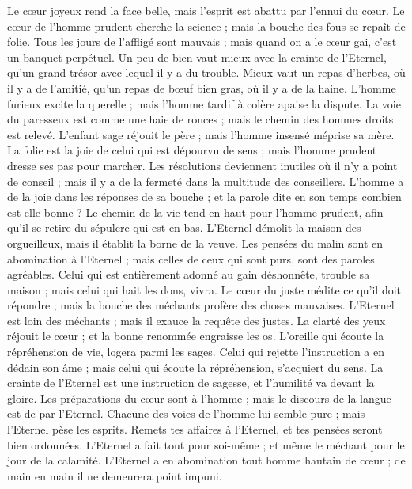 \begin{multicols}{2}
Le cœur joyeux rend la face belle, mais l'esprit est abattu par l'ennui du cœur.
Le cœur de l'homme prudent cherche la science ; mais la bouche des fous se repaît de folie.
Tous les jours de l'affligé sont mauvais ; mais quand on a le cœur gai, c'est un banquet perpétuel.
Un peu de bien vaut mieux avec la crainte de l'Eternel, qu'un grand trésor avec lequel il y a du trouble.
Mieux vaut un repas d'herbes, où il y a de l'amitié, qu'un repas de bœuf bien gras, où il y a de la haine.
L'homme furieux excite la querelle ; mais l'homme tardif à colère apaise la dispute.
La voie du paresseux est comme une haie de ronces ; mais le chemin des hommes droits est relevé.
L'enfant sage réjouit le père ; mais l'homme insensé méprise sa mère.
La folie est la joie de celui qui est dépourvu de sens ; mais l'homme prudent dresse ses pas pour marcher.
Les résolutions deviennent inutiles où il n'y a point de conseil ; mais il y a de la fermeté dans la multitude des conseillers.
L'homme a de la joie dans les réponses de sa bouche ; et la parole dite en son temps combien est-elle bonne ?
Le chemin de la vie tend en haut pour l'homme prudent, afin qu'il se retire du sépulcre qui est en bas.
L'Eternel démolit la maison des orgueilleux, mais il établit la borne de la veuve.
Les pensées du malin sont en abomination à l'Eternel ; mais celles de ceux qui sont purs, sont des paroles agréables.
Celui qui est entièrement adonné au gain déshonnête, trouble sa maison ; mais celui qui hait les dons, vivra.
Le cœur du juste médite ce qu'il doit répondre ; mais la bouche des méchants profère des choses mauvaises.
L'Eternel est loin des méchants ; mais il exauce la requête des justes.
La clarté des yeux réjouit le cœur ; et la bonne renommée engraisse les os.
L'oreille qui écoute la répréhension de vie, logera parmi les sages.
Celui qui rejette l'instruction a en dédain son âme ; mais celui qui écoute la répréhension, s'acquiert du sens.
La crainte de l'Eternel est une instruction de sagesse, et l'humilité va devant la gloire.
\VerseOne{}Les préparations du cœur sont à l'homme ; mais le discours de la langue est de par l'Eternel.
Chacune des voies de l'homme lui semble pure ; mais l'Eternel pèse les esprits.
Remets tes affaires à l'Eternel, et tes pensées seront bien ordonnées.
L'Eternel a fait tout pour soi-même ; et même le méchant pour le jour de la calamité.
L'Eternel a en abomination tout homme hautain de cœur ; de main en main il ne demeurera point impuni.

\end{multicols}
